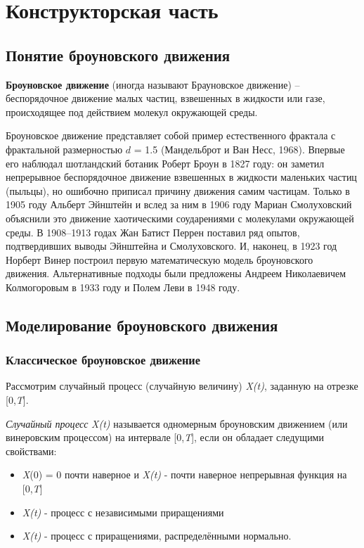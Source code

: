 \chapter{Конструкторская часть}

\section{Понятие броуновского движения}

\textbf{Броуновское движение} (иногда называют Брауновское движение) -- беспорядочное движение малых частиц, взвешенных в жидкости или газе, происходящее под действием молекул окружающей среды. 


Броуновское движение представляет собой пример естественного фрактала с фрактальной размерностью $d$ = 1.5 (Мандельброт и Ван Несс, 1968). Впервые его наблюдал шотландский ботаник Роберт  Броун в 1827 году: он  заметил  непрерывное  беспорядочное движение взвешенных в жидкости маленьких частиц (пыльцы), но ошибочно приписал причину движения самим частицам. Только в 1905 году Альберт Эйнштейн и вслед за ним в 1906 году Мариан Смолуховский объяснили это движение хаотическими соударениями с молекулами окружающей среды. В 1908–1913 годах Жан Батист Перрен поставил ряд опытов, подтвердивших выводы Эйнштейна и Смолуховского. И, наконец, в 1923 год Норберт Винер построил первую математическую модель броуновского движения. Альтернативные подходы были предложены Андреем Николаевичем Колмогоровым в 1933 году и Полем Леви в 1948 году.

\section{Моделирование броуновского движения}

\subsection{Классическое броуновское движение}

Рассмотрим случайный процесс (случайную величину) \textit{X(t)}, заданную на отрезке [0,\textit{T}].

\textit{Случайный процесс}  \textit{X(t)} называется одномерным броуновским движением (или винеровским процессом) на интервале [0,\textit{T}], если он обладает следущими свойствами:
\begin{itemize} 
	\item \textit{X}(0) = 0 почти наверное и \textit{X(t)} - почти наверное непрерывная функция на [0,\textit{T}]
	\item \textit{X(t)} - процесс с независимыми приращениями
	\item  \textit{X(t)} -  процесс с приращениями, распределёнными нормально.
\end{itemize}

